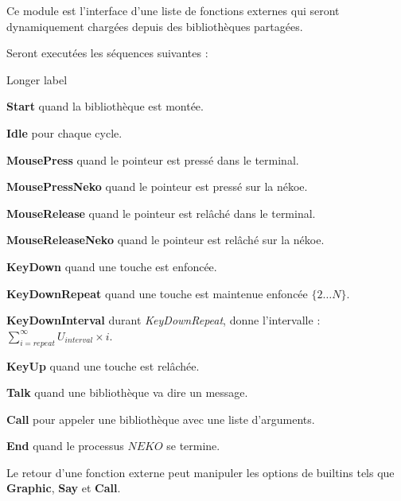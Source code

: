 \documentclass{report}
\newcommand{\program}{\textit{NEKO}}
\begin{document}
Ce module est l'interface d'une liste de fonctions externes qui seront dynamiquement chargées depuis des bibliothèques partagées.

Seront executées les séquences suivantes :

\begin{labeling}{Longer label\quad}
	\item[\textbf{Start} quand la bibliothèque est montée.]
	\item[\textbf{Idle} pour chaque cycle.]
	\item[\textbf{MousePress} quand le pointeur est pressé dans le terminal.]
	\item[\textbf{MousePressNeko} quand le pointeur est pressé sur la nékoe.]
	\item[\textbf{MouseRelease} quand le pointeur est relâché dans le terminal.]
	\item[\textbf{MouseReleaseNeko} quand le pointeur est relâché sur la nékoe.]
	\item[\textbf{KeyDown} quand une touche est enfoncée.]
	\item[\textbf{KeyDownRepeat} quand une touche est maintenue enfoncée $\{2\dots{}N\}$.]
	\item[\textbf{KeyDownInterval} durant \textit{KeyDownRepeat}, donne l'intervalle : $\sum_{i=repeat}^{\infty} U_{interval}\times{}i$.]
	\item[\textbf{KeyUp} quand une touche est relâchée.]
	\item[\textbf{Talk} quand une bibliothèque va dire un message.]
	\item[\textbf{Call} pour appeler une bibliothèque avec une liste d'arguments.]
	\item[\textbf{End} quand le processus $\program$ se termine.]
\end{labeling}

Le retour d'une fonction externe peut manipuler les options de builtins tels que \textbf{Graphic}, \textbf{Say} et \textbf{Call}.
\end{document}
